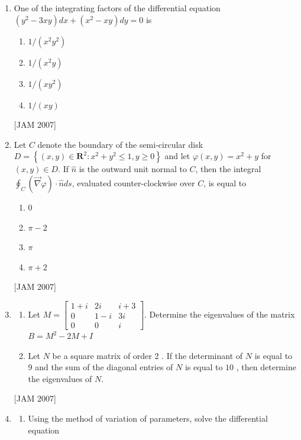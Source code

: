 \begin{enumerate}
\item One of the integrating factors of the differential equation $\left(y^{2}-3 x y\right) d x+\left(x^{2}-x y\right) d y=0$ is
\begin{enumerate}
\item $1 /\left(x^{2} y^{2}\right)$
\item $1 /\left(x^{2} y\right)$
\item $1 /\left(x y^{2}\right)$
\item $1 /(x y)$
\end{enumerate}
 \hfill [JAM 2007]



  \item Let $C$ denote the boundary of the semi-circular disk $D=\left\{(x, y) \in \mathbf{R}^{2}: x^{2}+y^{2} \leq 1, y \geq 0\right\}$ and let $\varphi(x, y)=x^{2}+y$ for $(x, y) \in D$. If $\hat{n}$ is the outward unit normal to $C$, then the integral $\oint_{C}(\vec{\nabla} \varphi) \cdot \hat{n} d s$, evaluated counter-clockwise over $C$, is equal to
  \begin{enumerate}
\item 0
\item $\pi-2$
\item $\pi$
\item $\pi+2$ 
\end{enumerate}
 \hfill [JAM 2007]

 
\item 
\begin{enumerate}
    \item Let $M=\left[\begin{array}{ccc}1+i & 2 i & i+3 \\ 0 & 1-i & 3 i \\ 0 & 0 & i\end{array}\right]$. Determine the eigenvalues of the matrix $B=M^{2}-2 M+I$

\item  Let $N$ be a square matrix of order 2 . If the determinant of $N$ is equal to 9 and the sum of the diagonal entries of $N$ is equal to $10$ , then determine the eigenvalues of $N$.
\end{enumerate} 
 \hfill [JAM 2007]





\item 
\begin{enumerate}
  \item Using the method of variation of parameters, solve the differential equation


\end{enumerate}
\end{enumerate}
